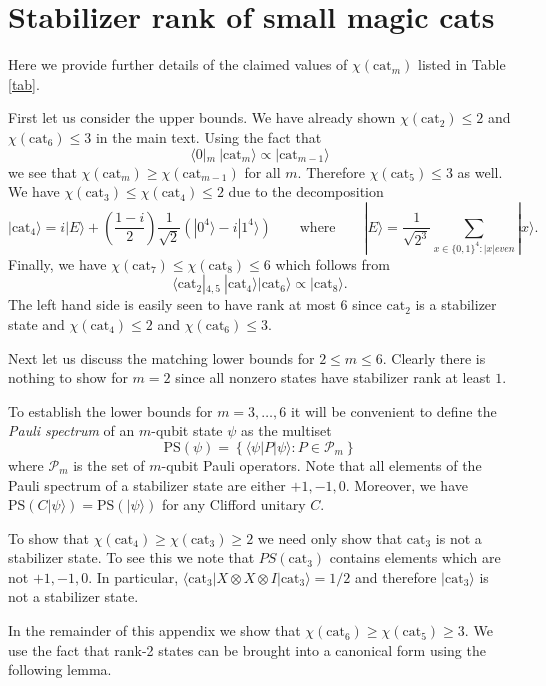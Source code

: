 \documentclass[a4paper,onecolumn,11pt,accepted=2021-11-11]{quantumarticle}
\newcommand{\cat}{\text{cat}}
\newcommand{\ket}[1]{\ensuremath{\lvert #1 \rangle}}
\begin{document}



\appendix
\section{Stabilizer rank of small magic cats}
Here we provide further details of the claimed values of $\chi(\cat_m)$ listed in Table \ref{tab}.  

First let us consider the upper bounds. We have already shown $\chi(\cat_2)\leq 2$ and $\chi(\cat_6)\leq 3$ in the main text. Using the fact that
\[
\langle 0|_m ~|\cat_m\rangle \propto |\cat_{m-1}\rangle
\]
we see that $\chi(\cat_{m})\geq \chi(\cat_{m-1})$ for all $m$. Therefore $\chi(\cat_5)\leq 3$ as well. We have $\chi(\cat_3)\leq\chi(\cat_4)\leq 2$ due to the decomposition
\[
|\cat_4\rangle=i|E\rangle+\left(\frac{1-i}{2}\right)\frac{1}{\sqrt{2}}\left(|0^4\rangle-i|1^4\rangle\right) \qquad \text{where} \qquad |E\rangle=\frac{1}{\sqrt{2^3}}\sum_{x\in \{0,1\}^4: |x| even} |x\rangle.
\]
Finally, we have $\chi(\cat_7)\leq \chi(\cat_8)\leq 6$ which follows from
\[
 \langle \cat_2|_{4,5}~|\cat_4\rangle|\cat_6\rangle\propto |\cat_8\rangle.
\]
The left hand side is easily seen to have rank at most $6$ since $\cat_2$ is a stabilizer state and $\chi(\cat_4)\leq 2$ and $\chi(\cat_6)\leq 3$.

Next let us discuss the matching lower bounds for $2\leq m\leq 6$. Clearly there is nothing to show for $m=2$ since all nonzero states have stabilizer rank at least $1$.

To establish the lower bounds for $m=3,\ldots , 6$ it will be convenient to define the \textit{Pauli spectrum} \cite{beverland2020lower} of an $m$-qubit state $\psi$ as the multiset
\[
\mathrm{PS}(\psi)=\left\{\langle \psi|P|\psi\rangle: P\in \mathcal{P}_m\right\}
\]
where $\mathcal{P}_m$ is the set of $m$-qubit Pauli operators. Note that all elements of the Pauli spectrum of a stabilizer state are either $+1,-1,0$. Moreover, we have $\mathrm{PS}(C|\psi\rangle)=\mathrm{PS}(|\psi\rangle)$ for any Clifford unitary $C$.

To show that $\chi(\cat_4)\geq \chi(\cat_3)\geq 2$ we need only show that $\cat_3$ is not a stabilizer state. To see this we note that $PS(\cat_3)$ contains elements which are not $+1,-1,0$. In particular,  $\langle \cat_3| X\otimes X\otimes I|\cat_3\rangle=1/2$ and therefore $\ket{\cat_3}$ is not a stabilizer state.

In the remainder of this appendix we show that $\chi(\cat_6)\geq \chi(\cat_5)\geq 3$. We use the fact that rank-2 states can be brought into a canonical form using the following lemma.
\end{document}
